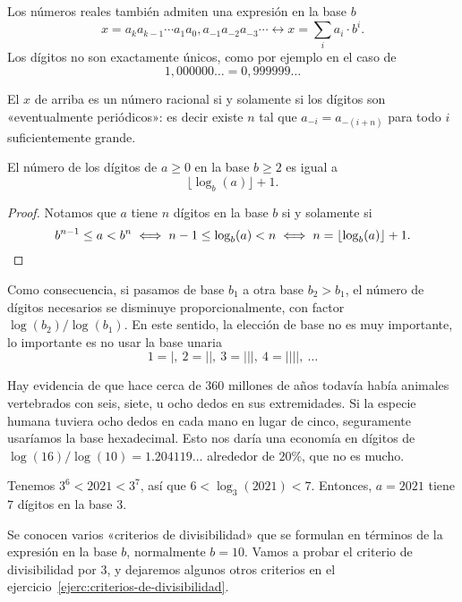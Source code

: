 \begin{comentario}
  Los números reales también admiten una expresión en la base $b$
  \[
    x = a_k a_{k-1} \cdots a_1 a_0, a_{-1} a_{-2} a_{-3} \cdots
    \longleftrightarrow
    x = \sum_i a_i\cdot b^i.
  \]
  Los dígitos no son exactamente únicos, como por ejemplo en el caso de
  $$1,000000\ldots = 0,999999\ldots$$

  El $x$ de arriba es un número racional si y solamente si los dígitos son
  «eventualmente periódicos»: es decir existe $n$ tal que $a_{-i} = a_{-(i+n)}$
  para todo $i$ suficientemente grande. 
\end{comentario}

\begin{proposicion}
  El número de los dígitos de $a \ge 0$ en la base $b \ge 2$ es igual a
  $$\lfloor\log_b (a)\rfloor + 1.$$

  \begin{proof}
    Notamos que $a$ tiene $n$ dígitos en la base $b$ si y solamente si
    \[
      b^{n-1} \le a < b^n
      \iff
      n-1 \le \log_b (a) < n
      \iff
      n = \lfloor\log_b (a)\rfloor + 1.
      \qedhere
    \]
  \end{proof}
\end{proposicion}

Como consecuencia, si pasamos de base $b_1$ a otra base $b_2 > b_1$, el número
de dígitos necesarios se disminuye proporcionalmente, con factor
$\log (b_2) / \log (b_1)$. En este sentido, la elección de base no es muy
importante, lo importante es no usar la base unaria
\[ 1 = |, ~ 2 = ||, ~ 3 = |||, ~ 4 = ||||, ~ \ldots \]

\begin{ejemplo}
  Hay evidencia de que hace cerca de 360 millones
    de años todavía había animales vertebrados con seis, siete, u ocho dedos en
    sus extremidades.
  Si la especie humana tuviera ocho dedos en cada mano en lugar de cinco,
  seguramente usaríamos la base hexadecimal. Esto nos daría una economía en
  dígitos de $\log(16)/\log(10) = 1.204119\ldots$ alrededor de $20\%$, que no es
  mucho.
\end{ejemplo}

\begin{ejemplo}
  Tenemos $3^6 < 2021 < 3^7$, así que $6 < \log_3 (2021) < 7$. Entonces,
  $a = 2021$ tiene $7$ dígitos en la base $3$.
\end{ejemplo}

Se conocen varios «criterios de divisibilidad» que se formulan en términos de la
expresión en la base $b$, normalmente $b = 10$. Vamos a probar el criterio de
divisibilidad por $3$, y dejaremos algunos otros criterios en el
ejercicio~\ref{ejerc:criterios-de-divisibilidad}.

